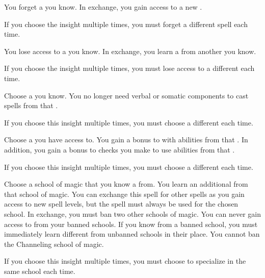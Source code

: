         {
             You forget a  you know.
            In exchange, you gain access to a new .
            \par If you choose the insight multiple times, you must forget a different spell each time.

             You lose access to a  you know.
            In exchange, you learn a  from another  you know.
            \par If you choose the insight multiple times, you must lose access to a different  each time.

             Choose a  you know.
            You no longer need verbal or somatic components to cast spells from that .
            \par If you choose this insight multiple times, you must choose a different  each time.

             Choose a  you have access to.
            You gain a  bonus to  with abilities from that .
            In addition, you gain a  bonus to  checks you make to use abilities from that .
            \par If you choose this insight multiple times, you must choose a different  each time.

             Choose a school of magic that you know a  from.
            You learn an additional  from that school of magic.
            You can exchange this spell for other spells as you gain access to new spell levels, but the spell must always be used for the chosen school.
            In exchange, you must ban two other schools of magic.
            You can never gain access to  from your banned schools.
            If you know  from a banned school, you must immediately learn different  from unbanned schools in their place.
            You cannot ban the Channeling school of magic.
            \par If you choose this insight multiple times, you must choose to specialize in the same school each time.

}
